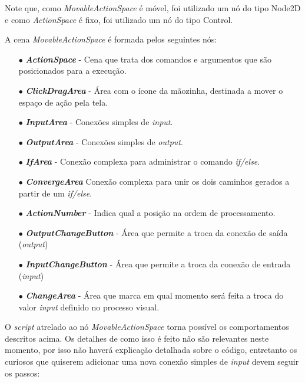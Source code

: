 Note que, como \textit{MovableActionSpace} é móvel, foi utilizado um nó do tipo
Node2D e como \textit{ActionSpace} é fixo, foi utilizado um nó do tipo Control.

A cena \textit{MovableActionSpace} é formada pelos seguintes nós:

\begin{itemize}
    \item[$\bullet$]
        \textbf{\textit{ActionSpace}} - Cena que trata dos comandos e argumentos
        que são posicionados para a execução.   
    \item[$\bullet$]
        \textbf{\textit{ClickDragArea}} - Área com o ícone da mãozinha, 
        destinada a mover o espaço de ação pela tela. 
    \item[$\bullet$]
        \textbf{\textit{InputArea}} - Conexões simples de \textit{input}.
    \item[$\bullet$]
        \textbf{\textit{OutputArea}} - Conexões simples de \textit{output}.  
    \item[$\bullet$]
        \textbf{\textit{IfArea}} - Conexão complexa para administrar o comando 
        \textit{if/else}.
    \item[$\bullet$]
        \textbf{\textit{ConvergeArea}} Conexão complexa para unir os dois 
        caminhos gerados a partir de um \textit{if/else}.
    \item[$\bullet$]
        \textbf{\textit{ActionNumber}} - Indica qual a posição na ordem de 
        processamento.
    \item[$\bullet$]
        \textbf{\textit{OutputChangeButton}} - Área que permite a troca da 
        conexão de saída (\textit{output})
    \item[$\bullet$]
        \textbf{\textit{InputChangeButton}} - Área que permite a troca da 
        conexão de entrada (\textit{input})
    \item[$\bullet$] 
        \textbf{\textit{ChangeArea}} - Área que marca em qual momento será feita
        a troca do valor \textit{input} definido no processo visual.
\end{itemize}

O \textit{script} atrelado ao nó \textit{MovableActionSpace} torna possível
os comportamentos descritos acima. Os detalhes de como isso é feito não são
relevantes neste momento, por isso não haverá explicação detalhada sobre o 
código, entretanto os curiosos que quiserem adicionar uma nova conexão simples
de \textit{input} devem seguir os passos:

